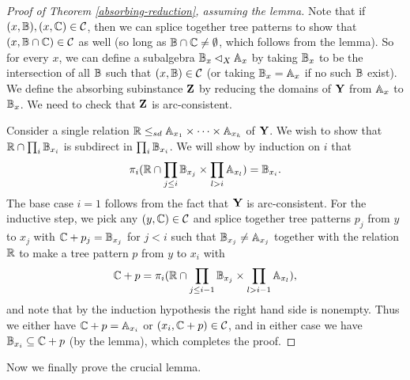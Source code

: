 \documentclass[letterpaper,11pt]{article}
\begin{document}
\begin{proof}[Proof of Theorem \ref{absorbing-reduction}, assuming the lemma] Note that if $(x,\mathbb{B}), (x,\mathbb{C}) \in \mathcal{C}$, then we can splice together tree patterns to show that $(x,\mathbb{B}\cap\mathbb{C}) \in \mathcal{C}$ as well (so long as $\mathbb{B} \cap \mathbb{C} \ne \emptyset$, which follows from the lemma). So for every $x$, we can define a subalgebra $\mathbb{B}_x \lhd_X \mathbb{A}_x$ by taking $\mathbb{B}_x$ to be the intersection of all $\mathbb{B}$ such that $(x,\mathbb{B}) \in \mathcal{C}$ (or taking $\mathbb{B}_x = \mathbb{A}_x$ if no such $\mathbb{B}$ exist). We define the absorbing subinstance $\mathbf{Z}$ by reducing the domains of $\mathbf{Y}$ from $\mathbb{A}_x$ to $\mathbb{B}_x$. We need to check that $\mathbf{Z}$ is arc-consistent.

Consider a single relation $\mathbb{R} \le_{sd} \mathbb{A}_{x_1} \times \cdots \times \mathbb{A}_{x_k}$ of $\mathbf{Y}$. We wish to show that $\mathbb{R}\cap \prod_i \mathbb{B}_{x_i}$ is subdirect in $\prod_i \mathbb{B}_{x_i}$. We will show by induction on $i$ that
\[
\pi_i(\mathbb{R} \cap \prod_{j\le i} \mathbb{B}_{x_j} \times \prod_{l > i} \mathbb{A}_{x_l}) = \mathbb{B}_{x_i}.
\]
The base case $i=1$ follows from the fact that $\mathbf{Y}$ is arc-consistent. For the inductive step, we pick any $(y,\mathbb{C}) \in \mathcal{C}$ and splice together tree patterns $p_j$ from $y$ to $x_j$ with $\mathbb{C} + p_j = \mathbb{B}_{x_j}$ for $j < i$ such that $\mathbb{B}_{x_j} \ne \mathbb{A}_{x_j}$ together with the relation $\mathbb{R}$ to make a tree pattern $p$ from $y$ to $x_i$ with
\[
\mathbb{C} + p = \pi_i(\mathbb{R} \cap \prod_{j \le i-1} \mathbb{B}_{x_j} \times \prod_{l > i-1} \mathbb{A}_{x_l}),
\]
and note that by the induction hypothesis the right hand side is nonempty. Thus we either have $\mathbb{C} + p = \mathbb{A}_{x_i}$ or $(x_i,\mathbb{C}+p) \in \mathcal{C}$, and in either case we have $\mathbb{B}_{x_i} \subseteq \mathbb{C}+p$ (by the lemma), which completes the proof.
\end{proof}

Now we finally prove the crucial lemma.
\end{document}
